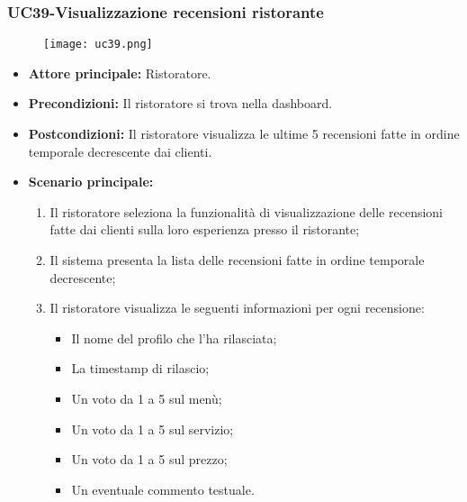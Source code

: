 \subsubsection{UC39-Visualizzazione recensioni ristorante} %
\begin{figure}[h] \texttt{[image: uc39.png]} \end{figure}
\begin{itemize}
\item \textbf{Attore principale:} Ristoratore.
\item \textbf{Precondizioni:} Il ristoratore si trova nella dashboard.
\item \textbf{Postcondizioni:} Il ristoratore visualizza le ultime 5 recensioni fatte in ordine temporale decrescente dai clienti.
\item \textbf{Scenario principale:}
\begin{enumerate}
    \item Il ristoratore seleziona la funzionalità di visualizzazione delle recensioni fatte dai clienti sulla loro esperienza presso il ristorante;
    \item Il sistema presenta la lista delle recensioni fatte in ordine temporale decrescente;
    \item Il ristoratore visualizza le seguenti informazioni per ogni recensione:
    \begin{itemize}
        \item Il nome del profilo che l'ha rilasciata;
        \item La timestamp di rilascio;
        \item Un voto da 1 a 5 sul menù;
        \item Un voto da 1 a 5 sul servizio;
        \item Un voto da 1 a 5 sul prezzo;
        \item Un eventuale commento testuale.
    \end{itemize}
\end{enumerate}
\end{itemize}

